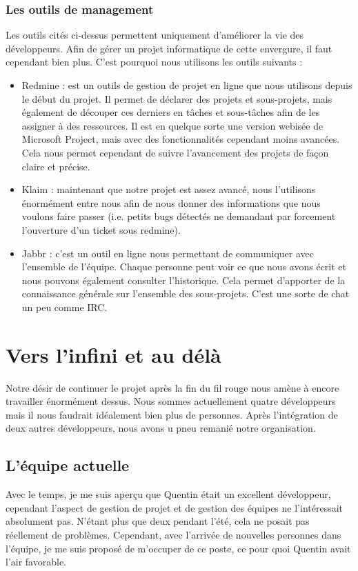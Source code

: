 \documentclass{article}
\begin{document}
\subsubsection{Les outils de management}
		Les outils cités ci-dessus permettent uniquement d'améliorer la vie des développeurs. Afin de gérer un projet informatique de cette envergure, il faut cependant bien plus. C'est pourquoi nous utilisons les outils suivants : 
		\begin{itemize}
			\item Redmine : est un outils de gestion de projet en ligne que nous utilisons depuis le début du projet. Il permet de déclarer des projets et sous-projets, mais également de découper ces derniers en tâches et sous-tâches afin de les assigner à des ressources. Il est en quelque sorte une version webisée de Microsoft Project, mais avec des fonctionnalités cependant moins avancées. Cela nous permet cependant de suivre l'avancement des projets de façon claire et précise.
			\item Klaim : maintenant que notre projet est assez avancé, nous l'utilisons énormément entre nous afin de nous donner des informations que nous voulons faire passer (i.e. petits bugs détectés ne demandant par forcement l'ouverture d'un ticket sous redmine).
			\item Jabbr : c'est un outil en ligne nous permettant de communiquer avec l'ensemble de l'équipe. Chaque personne peut voir ce que nous avons écrit et nous pouvons également consulter l'historique. Cela permet d'apporter de la connaissance générale sur l'ensemble des sous-projets. C'est une sorte de chat un peu comme IRC.
		\end{itemize}

\section{Vers l'infini et au délà}

	Notre désir de continuer le projet après la fin du fil rouge nous amène à encore travailler énormément dessus. Nous sommes actuellement quatre développeurs mais il nous faudrait idéalement bien plus de personnes. Après l'intégration de deux autres développeurs, nous avons u pneu remanié notre organisation.

	\subsection{L'équipe actuelle}
	Avec le temps, je me suis aperçu que Quentin était un excellent développeur, cependant l'aspect de gestion de projet et de gestion des équipes ne l'intéressait absolument pas. N'étant plus que deux pendant l'été, cela ne posait pas réellement de problèmes. Cependant, avec l'arrivée de nouvelles personnes dans l'équipe, je me suis proposé de m'occuper de ce poste, ce pour quoi Quentin avait l'air favorable. 
\end{document}
